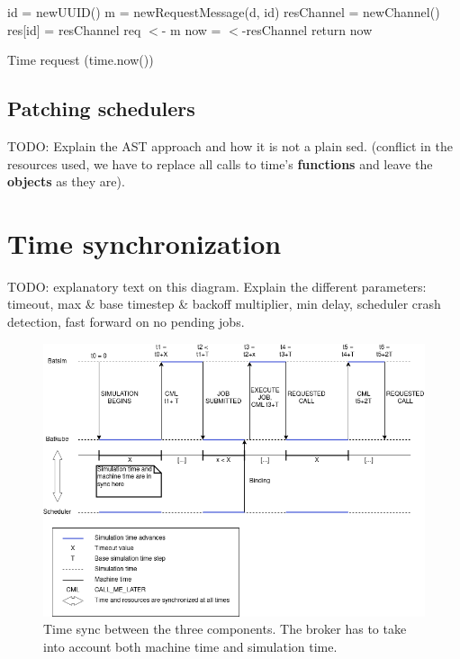 \begin{algorithm}[H]
\DontPrintSemicolon
{}

id = newUUID()\;
m = newRequestMessage(d, id) 
resChannel = newChannel()\;
res[id] = resChannel 
req $<$- m 
now = $<$-resChannel 
return now\;
\caption{Time request (time.now())}
\label{alg:now}
\end{algorithm}

\subsection{Patching schedulers}

TODO: Explain the AST approach and how it is not a plain sed. (conflict in the
resources used, we have to replace all calls to time's \textbf{functions} and
leave the \textbf{objects} as they are).

\section{Time synchronization}

TODO: explanatory text on this diagram. Explain the different parameters:
timeout, max \& base timestep \& backoff multiplier, min delay, scheduler crash
detection, fast forward on no pending jobs.
\begin{figure}[H]
	\centering
	\includegraphics[width=\textwidth]{imgs/lignes_de_temps.png}
	\caption{Time sync between the three components. The broker has to take
	into account both machine time and simulation time.}
	\label{fig:time_sync}
\end{figure}
